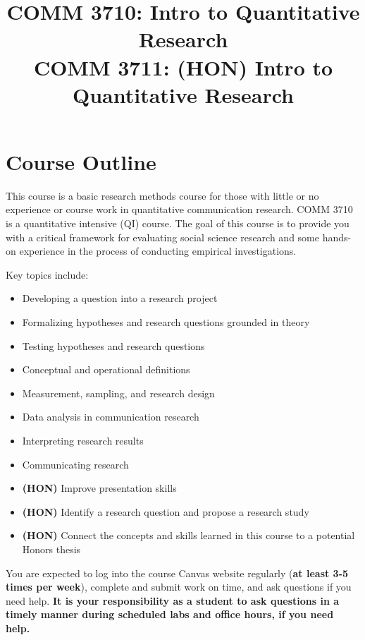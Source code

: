 \documentclass[
  letterpaper,
]{article}
\title{COMM 3710: Intro to Quantitative Research\\
COMM 3711: \textbf{(HON)} Intro to Quantitative Research}
\subtitle{Lecture: Mondays (9:40 - 11:35 am), BEH S 111\\
Lab: Wednesdays (9:40 - 11:35 am), BEH S 111\\
\strut \\
Professor: Dr.~Sara K. Yeo\\
Email: \href{mailto:sara.yeo@utah.edu}{\nolinkurl{sara.yeo@utah.edu}}\\
Office Hours:
\href{https://outlook.office.com/bookwithme/user/98f1ac91631e47eb9f502658b45494f9@umail.utah.edu/meetingtype/SVRwCe7HMUGxuT6WGxi68g2?bookingcode=6a99b2dc-526d-4185-8078-0f5a72d23764&anonymous&ismsaljsauthenabled&ep=mlink}{By
appointment}}
\author{}
\date{}
\providecommand{\tightlist}{%
  \setlength{\itemsep}{0pt}\setlength{\parskip}{0pt}}\usepackage{longtable,booktabs,array}
\begin{document}
\maketitle


\section{Course Outline}\label{sec-outline}

This course is a basic research methods course for those with little or
no experience or course work in quantitative communication research.
COMM 3710 is a quantitative intensive (QI) course. The goal of this
course is to provide you with a critical framework for evaluating social
science research and some hands-on experience in the process of
conducting empirical investigations.

Key topics include:

\begin{itemize}
\tightlist
\item
  Developing a question into a research project
\item
  Formalizing hypotheses and research questions grounded in theory
\item
  Testing hypotheses and research questions
\item
  Conceptual and operational definitions
\item
  Measurement, sampling, and research design
\item
  Data analysis in communication research
\item
  Interpreting research results
\item
  Communicating research
\item
  \textbf{(HON)} Improve presentation skills
\item
  \textbf{(HON)} Identify a research question and propose a research
  study
\item
  \textbf{(HON)} Connect the concepts and skills learned in this course
  to a potential Honors thesis
\end{itemize}

\begin{tcolorbox}[enhanced jigsaw, breakable, coltitle=black, opacityback=0, rightrule=.15mm, colframe=quarto-callout-note-color-frame, bottomtitle=1mm, opacitybacktitle=0.6, bottomrule=.15mm, left=2mm, toptitle=1mm, titlerule=0mm, title=\textcolor{quarto-callout-note-color}{\faInfo}\hspace{0.5em}{Note}, colback=white, arc=.35mm, toprule=.15mm, leftrule=.75mm, colbacktitle=quarto-callout-note-color!10!white]

You are expected to log into the course Canvas website regularly
(\textbf{at least 3-5 times per week}), complete and submit work on
time, and ask questions if you need help. \textbf{It is your
responsibility as a student to ask questions in a timely manner during
scheduled labs and office hours, if you need help.}

\end{tcolorbox}
\end{document}
